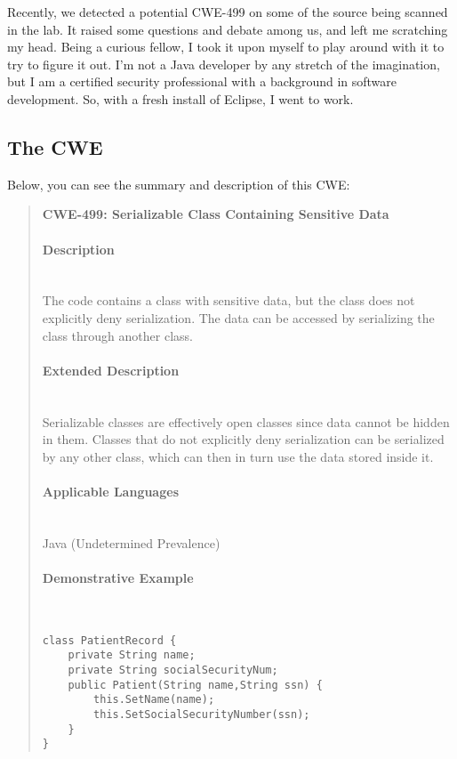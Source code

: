 Recently, we detected a potential CWE-499 on some of the source being scanned in the lab. It raised some questions and debate among us, and left me scratching my head. Being a curious fellow, I took it upon myself to play around with it to try to figure it out. I'm not a Java developer by any stretch of the imagination, but I am a certified security professional with a background in software development. So, with a fresh install of Eclipse, I went to work.

\subsection{The CWE}
Below, you can see the summary and description of this CWE:
\begin{quote}
	\textbf{CWE-499: Serializable Class Containing Sensitive Data}

	\paragraph{Description}~\\
	The code contains a class with sensitive data, but the class does not explicitly deny serialization. The data can be accessed by serializing the class through another class.

	\paragraph{Extended Description}~\\
	Serializable classes are effectively open classes since data cannot be hidden in them. Classes that do not explicitly deny serialization can be serialized by any other class, which can then in turn use the data stored inside it.

	\paragraph{Applicable Languages}~\\
	Java (Undetermined Prevalence)

	\paragraph{Demonstrative Example}~\\
	\begin{lstlisting}[caption={Example 1},captionpos=b,style=JavaStyle,label={lst:20210830:ex1}]
class PatientRecord {
	private String name;
	private String socialSecurityNum;
	public Patient(String name,String ssn) {
		this.SetName(name);
		this.SetSocialSecurityNumber(ssn);
	}
}
	\end{lstlisting}\autocite{20210830:cwe-499}
\end{quote}

